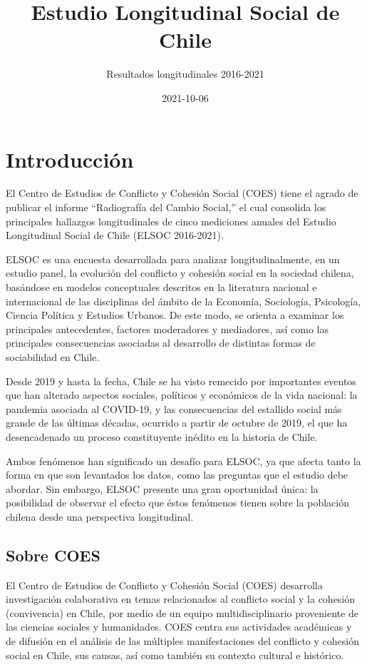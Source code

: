\documentclass[
  12pt,
]{book}
\title{Estudio Longitudinal Social de Chile}
\subtitle{Resultados longitudinales 2016-2021}
\author{}
\date{\vspace{-2.5em}2021-10-06}
\begin{document}
\maketitle

{
\setcounter{tocdepth}{1}
\tableofcontents
}
\listoftables
\listoffigures
{}
\hypertarget{introducciuxf3n}{%
\chapter{Introducción}\label{introducciuxf3n}}

El Centro de Estudios de Conflicto y Cohesión Social (COES) tiene el agrado de publicar el informe ``Radiografía del Cambio Social,'' el cual consolida los principales hallazgos longitudinales de cinco mediciones anuales del Estudio Longitudinal Social de Chile (ELSOC 2016-2021).

ELSOC es una encuesta desarrollada para analizar longitudinalmente, en un estudio panel, la evolución del conflicto y cohesión social en la sociedad chilena, basándose en modelos conceptuales descritos en la literatura nacional e internacional de las disciplinas del ámbito de la Economía, Sociología, Psicología, Ciencia Política y Estudios Urbanos. De este modo, se orienta a examinar los principales antecedentes, factores moderadores y mediadores, así como las principales consecuencias asociadas al desarrollo de distintas formas de sociabilidad en Chile.

Desde 2019 y hasta la fecha, Chile se ha visto remecido por importantes eventos que han alterado aspectos sociales, políticos y económicos de la vida nacional: la pandemia asociada al COVID-19, y las consecuencias del estallido social más grande de las últimas décadas, ocurrido a partir de octubre de 2019, el que ha desencadenado un proceso constituyente inédito en la historia de Chile.

Ambos fenómenos han significado un desafío para ELSOC, ya que afecta tanto la forma en que son levantados los datos, como las preguntas que el estudio debe abordar. Sin embargo, ELSOC presente una gran oportunidad única: la posibilidad de observar el efecto que éstos fenómenos tienen sobre la población chilena desde una perspectiva longitudinal.

\hypertarget{sobre-coes}{%
\section{Sobre COES}\label{sobre-coes}}

El Centro de Estudios de Conflicto y Cohesión Social (COES) desarrolla investigación colaborativa en temas relacionados al conflicto social y la cohesión (convivencia) en Chile, por medio de un equipo multidisciplinario proveniente de las ciencias sociales y humanidades. COES centra sus actividades académicas y de difusión en el análisis de las múltiples manifestaciones del conflicto y cohesión social en Chile, sus causas, así como también su contexto cultural e histórico.
\end{document}
